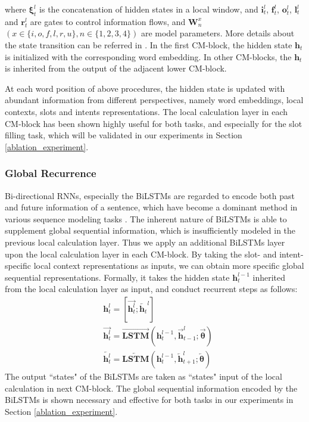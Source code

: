 \documentclass[11pt,a4paper]{article}
\begin{document}
where $\mathbf { \xi } _ { t } ^ { l }$ is the concatenation of hidden states in a local window, and $\mathbf{i}_t^l$, $\mathbf{f}_t^l$, $\mathbf{o}_t^l$, $\mathbf{l}_t^l$ and $\mathbf{r}_t^l$ are gates to control information flows, and $\mathbf{W}_n^x$ $(x \in \{ i, o, f, l, r, u\}, n \in \{1, 2, 3, 4\})$ are model parameters. More details about the state transition can be referred in \cite{SLSTM_2018}. In the first CM-block, the hidden state $\mathbf{h}_t$ is initialized with the corresponding word embedding. In other CM-blocks, the $\mathbf{h}_t$ is inherited from the output of the adjacent lower CM-block.

At each word position of above procedures, the hidden state is updated with abundant information from different perspectives, namely word embeddings, local contexts, slots and intents representations. The local calculation layer in each CM-block has been shown highly useful for both tasks, and especially for the slot filling task, which will be validated in our experiments in Section \ref{ablation_experiment}.

\subsubsection*{Global Recurrence}
Bi-directional RNNs, especially the BiLSTMs \cite{LSTM_1997} are regarded to encode both past and future information of a sentence, which have become a dominant method in various sequence modeling tasks \cite{first_LSTM_2003,lstm_lm_2012}. 
The inherent nature of BiLSTMs is able to supplement  global sequential information, which is insufficiently modeled in the previous local calculation layer. 
Thus we apply an additional BiLSTMs layer upon the local calculation layer in each CM-block. By taking the slot- and intent-specific local context representations as inputs, we can obtain more specific global sequential representations. Formally, it takes the hidden state $\mathbf{h}_t^{l-1}$ inherited from the local calculation layer as input, and conduct recurrent steps as follows:
\begin{equation}
    \begin{split}
    & \mathbf{h}_t^{l} = [\overrightarrow{\mathbf{h}_t^{l}}; \overleftarrow{\mathbf{h}_t}^{l}] \\
    & \overrightarrow{\mathbf{h}_t^{l}} = \overrightarrow{\mathbf{LSTM}}(\mathbf{h}_t^{l-1}, \overrightarrow{\mathbf{h}}_{t-1}^{l}; \mathbf{\overrightarrow{\theta}}) \\
    & \overleftarrow{\mathbf{h}_t^{l}} = \overleftarrow{\mathbf{LSTM}}(\mathbf{h}_t^{l-1}, \overleftarrow{\mathbf{h}}_{t+1}^{l}; \mathbf{\overleftarrow{\theta}})
    \end{split}
\end{equation}
The output ``states" of the BiLSTMs are taken as ``states" input of the local calculation in next CM-block. The global sequential information encoded by the BiLSTMs is shown necessary and effective for both tasks in our experiments in Section  \ref{ablation_experiment}.
\end{document}
